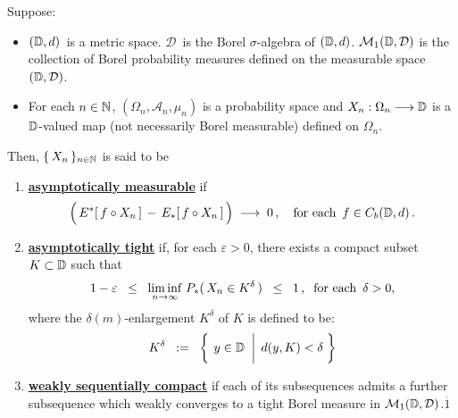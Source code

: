 \begin{definition}
\mbox{}\vskip 0.1cm
\noindent
Suppose:
\begin{itemize}
\item
	$(\mathbb{D},d)$\, is a metric space.
	$\mathcal{D}$\, is the Borel $\sigma$-algebra of $(\mathbb{D},d)$.
	\vskip 0.0cm
	$\mathcal{M}_{1}(\mathbb{D},\mathcal{D})$ is the collection of Borel probability measures
	defined on the measurable space $(\mathbb{D},\mathcal{D})$.
\item
	For each $n \in \mathbb{N}$,
	$(\Omega_{n},\mathcal{A}_{n},\mu_{n})$ is a probability space and
	$X_{n} : \Omega_{n} \longrightarrow \mathbb{D}$
	is a $\mathbb{D}$-valued map (not necessarily Borel measurable) defined on $\Omega_{n}$.
\end{itemize}
Then, $\{\,X_{n}\,\}_{n\in\mathbb{N}}$ is said to be
\begin{enumerate}
\item
	\underline{\textbf{asymptotically measurable}}\; if
	\begin{equation*}
	\left(\, \overset{{\color{white}.}}{E^{*}}\!\left[\,f \circ X_{n}\,\right] \,-\, E_{*}\!\left[\,f \circ X_{n}\,\right] \,\right)
	\;\longrightarrow\;
	0\,,
	\quad
	\textnormal{for each \,$f \in C_{b}(\D,d)$}\,.
	\end{equation*}
\item
	\underline{\textbf{asymptotically tight}}\; if, for each $\varepsilon > 0$, there exists
	a compact subset $K \subset \mathbb{D}$ such that
	\begin{equation*}
	1 - \varepsilon
	\;\; \leq \;\; \underset{n\rightarrow\infty}{\liminf}\; P_{*}(\,X_{n} \in K^{\delta}\,)
	\;\; \leq \;\; 1\,,
	\;\;
	\textnormal{for each \,$\delta > 0$},
	\end{equation*}
	where the $\delta(m)$-enlargement $K^{\delta}$ of $K$ is defined to be:
	\begin{equation*}
	K^{\delta}
		\;\; := \;\;
		\left\{\;
		\left.
		y \overset{{\color{white}-}}{\in} \D
		\;\;\right\vert\;
		d(y,K) < \delta
		\;\right\}
	\end{equation*}
\item
	\underline{\textbf{weakly sequentially compact}}\; if each of its subsequences
	admits a further subsequence which weakly converges to a {\color{red}tight}
	Borel measure in $\mathcal{M}_{1}(\mathbb{D},\mathcal{D})$.{\color{white}$\overset{.}{1}$}
\end{enumerate}
\end{definition}


